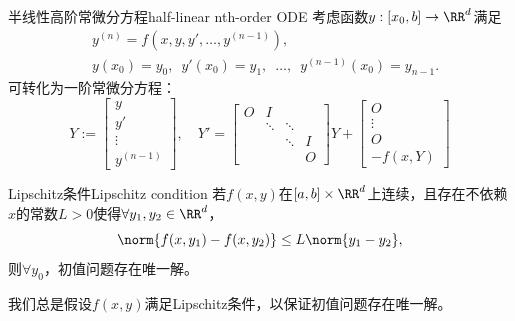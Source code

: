 \begin{definition}
    {半线性高阶常微分方程}{half-linear nth-order ODE}
    考虑函数$y:[x_0,b]\to\RR^d$满足
    \begin{subequations}
        \begin{align}
            &y^{(n)}=f(x,y,y',\dots,y^{(n-1)}),\\
            &y(x_0)=y_0,\enspace y'(x_0)=y_1,\enspace\ldots,\enspace y^{(n-1)}(x_0)=y_{n-1}.
        \end{align}
    \end{subequations}
    可转化为一阶常微分方程：
    \begin{equation}
        Y:=\begin{bmatrix}
            y\\y'\\\vdots\\y^{(n-1)}
        \end{bmatrix},\quad
        Y'=\begin{bmatrix}
            O&I\\ &\ddots&\ddots\\ &&\ddots&I\\ &&&O
        \end{bmatrix}Y+\begin{bmatrix}
            O\\\vdots\\O\\-f(x,Y)
        \end{bmatrix}
    \end{equation}
\end{definition}

\begin{theorem}
    {Lipschitz条件}{Lipschitz condition}
    若$f(x,y)$在$[a,b]\times\RR^d$上连续，且存在不依赖$x$的常数$L>0$使得$\forall y_1,y_2\in\RR^d$，
    \begin{equation}
        \norm{f(x,y_1)-f(x,y_2)}\leq L\norm{y_1-y_2},
    \end{equation}
    则$\forall y_0$，初值问题存在唯一解。
\end{theorem}

\begin{remark}
    我们总是假设$f(x,y)$满足Lipschitz条件，以保证初值问题存在唯一解。
\end{remark}

